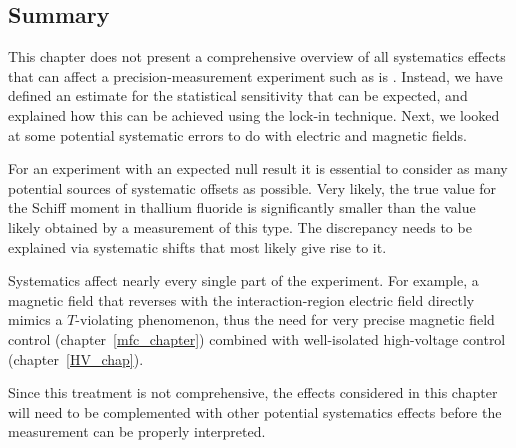 \subsection{Summary}


This chapter does not present a comprehensive overview of all systematics
effects that can affect a precision-measurement experiment such as is \CENTREX.
Instead, we have defined an estimate for the statistical sensitivity that can be
expected, and explained how this can be achieved using the lock-in technique.
Next, we looked at some potential systematic errors to do with electric and
magnetic fields.


For an experiment with an expected null result it is essential to consider as
many potential sources of systematic offsets as possible. Very likely, the true
value for the Schiff moment in thallium fluoride is significantly smaller than
the value likely obtained by a measurement of this type. The discrepancy needs
to be explained via systematic shifts that most likely give rise to it.


Systematics affect nearly every single part of the experiment. For example, a
magnetic field that reverses with the interaction-region electric field directly
mimics a $T$-violating phenomenon, thus the need for very precise magnetic field
control (chapter~\ref{mfc_chapter}) combined with well-isolated high-voltage
control (chapter~\ref{HV_chap}).


Since this treatment is not comprehensive, the effects considered in this
chapter will need to be complemented with other potential systematics effects
before the measurement can be properly interpreted.

